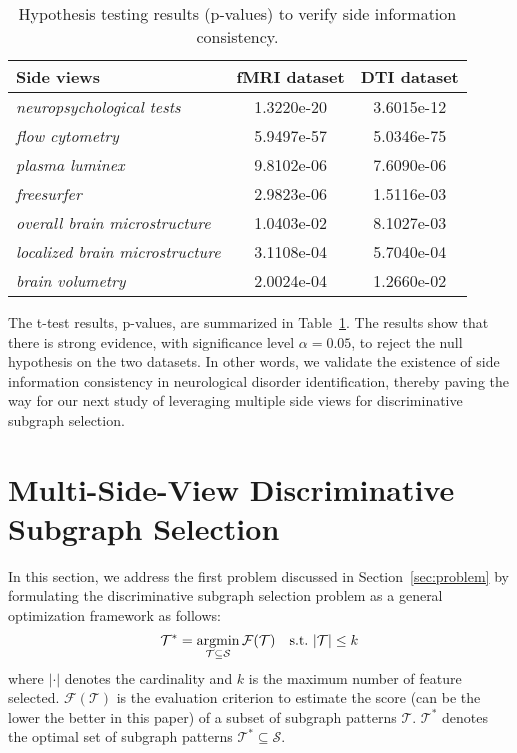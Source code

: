 \documentclass[conference]{IEEEtran}
\newcommand{\neu}[0]{\emph{neuropsychological tests}}
\newcommand{\flo}[0]{\emph{flow cytometry}}
\newcommand{\pla}[0]{\emph{plasma luminex}}
\newcommand{\fre}[0]{\emph{freesurfer}}
\newcommand{\ave}[0]{\emph{overall brain microstructure}}
\newcommand{\dti}[0]{\emph{localized brain microstructure}}
\newcommand{\seg}[0]{\emph{brain volumetry}}
\begin{document}
\begin{table}[!ht]
\caption{Hypothesis testing results (p-values) to verify side information consistency.}
\small
\label{tab:result_ttest}
\centering
\begin{tabular}{lcc}
\toprule%
Side views	&fMRI dataset &DTI dataset\\
\midrule %
{\neu}	&1.3220e-20	&3.6015e-12 \\
{\flo}  	&5.9497e-57	&5.0346e-75 \\
{\pla}  	&9.8102e-06	&7.6090e-06 \\
{\fre}  	&2.9823e-06	&1.5116e-03 \\
{\ave}	&1.0403e-02	&8.1027e-03 \\
{\dti}	&3.1108e-04	&5.7040e-04 \\
{\seg}	&2.0024e-04	&1.2660e-02 \\
\bottomrule%
\end{tabular}
\end{table}

The t-test results, p-values, are summarized in Table~\ref{tab:result_ttest}. The results show that there is strong evidence, with significance level $\alpha=0.05$, to reject the null hypothesis on the two datasets. In other words, we validate the existence of side information consistency in neurological disorder identification, thereby paving the way for our next study of leveraging multiple side views for discriminative subgraph selection.

\section{Multi-Side-View Discriminative \\Subgraph Selection}\label{sec:method}

In this section, we address the first problem discussed in Section~\ref{sec:problem} by formulating the discriminative subgraph selection problem as a general optimization framework as follows:
\begin{equation}
\mathcal{T}^*=\operatornamewithlimits{argmin}_{\mathcal{T}\subseteq\mathcal{S}}\mathcal{F}(\mathcal{T})~~~\text{s.t.}~|\mathcal{T}|\le k
\label{eq:argmin1}
\end{equation}
where $|\cdot|$ denotes the cardinality and $k$ is the maximum number of feature selected. $\mathcal{F}(\mathcal{T})$ is the evaluation criterion to estimate the score (can be the lower the better in this paper) of a subset of subgraph patterns $\mathcal{T}$. $\mathcal{T}^*$ denotes the optimal set of subgraph patterns $\mathcal{T}^*\subseteq\mathcal{S}$.
\end{document}
